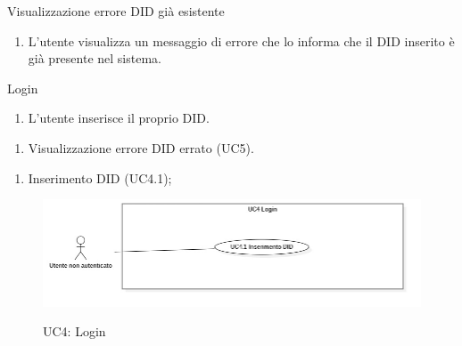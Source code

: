 \begin{usecase}{3}{Visualizzazione errore DID già esistente}\label{uc:registrazione-did-esistente}
  \usecasemain{}
  
  \begin{enumerate}
    \item L'utente visualizza un messaggio di errore che lo informa che il DID inserito è già presente nel sistema.
  \end{enumerate}
\end{usecase}

\begin{usecase}{4}{Login}\label{uc:autenticazione}
  \usecasemain{}
  
  \begin{enumerate}
    \item L'utente inserisce il proprio DID.
  \end{enumerate}

  \usecaseext{}
  \begin{enumerate}
    \item Visualizzazione errore DID errato (UC5).
  \end{enumerate}

  \begin{enumerate}
    \item Inserimento DID (UC4.1);
  \end{enumerate}
\end{usecase}

\begin{figure}[!ht] 
  \centering 
  \includegraphics[width=0.9\columnwidth, alt={Caso d'uso relativo all'autenticazione dell'utente}]{immagini/usecase/UC4.jpg}
  \caption{UC4: Login}\label{fig:uc:autenticazione}
\end{figure}

